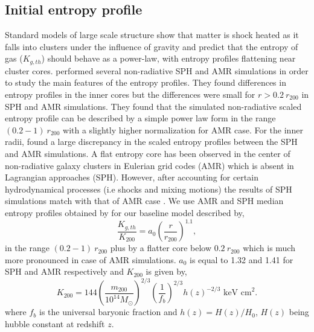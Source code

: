 \documentclass[a4paper,fleqn,usenatbib]{mnras}
\begin{document}
\subsection{Initial entropy profile}
Standard models of large scale structure show that matter is shock heated as it falls into clusters under the influence of gravity and predict that the entropy of gas ($K_{g,th}$) should behave as a
power-law, with entropy profiles flattening near cluster cores. \cite{Voit2005} performed several non-radiative SPH and AMR simulations in order to study the main features of the 
entropy profiles. They found differences in entropy profiles in the inner cores but the differences were small for $ r>0.2~r_{200}$ in SPH and AMR simulations. They found that the simulated non-radiative scaled entropy profile can  be  described by a simple power law form in the range    $(0.2-1)~r_{200}$ with  a slightly higher normalization for AMR case.
For the inner radii, \cite{Voit2005}  found a large discrepancy in the scaled entropy profiles between the SPH and AMR simulations. A flat entropy core has been observed in the center of non-radiative galaxy clusters in Eulerian grid codes (AMR) which is absent in Lagrangian approaches (SPH). However, after accounting for certain hydrodynamical processes (i.e shocks and mixing motions)  
the results of SPH simulations match with that of AMR case \citep{Mitchell2009,Vazza2011,Power2014}.
We use AMR and SPH median entropy profiles obtained by \cite{Voit2005} for our baseline model described by,
\begin{equation}
\frac{K_{g,th}}{K_{200}}=a_0\left(\frac{r}{r_{200}}\right)^{1.1},
\label{eq:voit1}
\end{equation}
in the range $(0.2-1)~r_{200}$ plus by a flatter core below $0.2~r_{200}$ which is much more pronounced in case of AMR simulations.  $a_0$ is equal to 1.32 and 1.41 for SPH and AMR respectively and $K_{200}$ is given by,
\begin{equation} 
K_{200}=144 \left(\frac{m_{200}}{10^{14}M_\odot}\right)^{2/3} \left(\frac{1}{f_b}\right)^{2/3} h(z)^{-2/3} \mbox{ keV cm}^2.
\label{K200}
\end{equation}
where $f_b$ is the universal baryonic fraction and $h(z)=H(z)/H_0$, $H(z)$ being hubble constant at redshift $z$.
\end{document}
